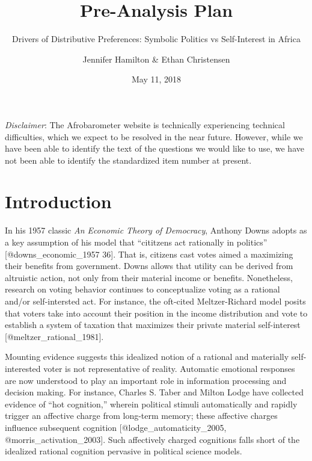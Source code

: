 \documentclass[]{article}
\title{Pre-Analysis Plan}
\subtitle{Drivers of Distributive Preferences: Symbolic Politics vs Self-Interest
in Africa}
\author{Jennifer Hamilton \& Ethan Christensen}
\date{May 11, 2018}
\begin{document}
\maketitle

\textit{Disclaimer}: The Afrobarometer website is technically
experiencing technical difficulties, which we expect to be resolved in
the near future. However, while we have been able to identify the text
of the questions we would like to use, we have not been able to identify
the standardized item number at present.

\section{Introduction}\label{introduction}

In his 1957 classic \textit{An Economic Theory of Democracy}, Anthony
Downs adopts as a key assumption of his model that ``cititzens act
rationally in politics'' {[}@downs\_economic\_1957 36{]}. That is,
citizens cast votes aimed a maximizing their benefits from government.
Downs allows that utility can be derived from altruistic action, not
only from their material income or benefits. Nonetheless, research on
voting behavior continues to conceptualize voting as a rational and/or
self-intersted act. For instance, the oft-cited Meltzer-Richard model
posits that voters take into account their position in the income
distribution and vote to establish a system of taxation that maximizes
their private material self-interest {[}@meltzer\_rational\_1981{]}.

Mounting evidence suggests this idealized notion of a rational and
materially self-interested voter is not representative of reality.
Automatic emotional responses are now understood to play an important
role in information processing and decision making. For instance,
Charles S. Taber and Milton Lodge have collected evidence of ``hot
cognition,'' wherein political stimuli automatically and rapidly trigger
an affective charge from long-term memory; these affective charges
influence subsequent cognition {[}@lodge\_automaticity\_2005,
@morris\_activation\_2003{]}. Such affectively charged cognitions falls
short of the idealized rational cognition pervasive in political science
models.
\end{document}
